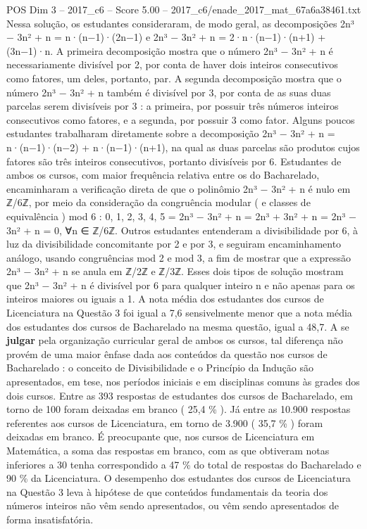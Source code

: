 \begin{textsample}{POS Dim 3 – 2017\_c6 – Score 5.00 – 2017\_c6/enade\_2017\_mat\_67a6a38461.txt}
Nessa solução, os estudantes consideraram, de modo geral, as decomposições 2n³ − 3n² + n = n·(n−1)·(2n−1) e 2n³ − 3n² + n = 2·n·(n−1)·(n+1) + (3n−1)·n.
A primeira decomposição mostra que o número 2n³ − 3n² + n é necessariamente divisível por 2, por conta de haver dois inteiros consecutivos como fatores, um deles, portanto, par.
A segunda decomposição mostra que o número 2n³ − 3n² + n também é divisível por 3, por conta de as suas duas parcelas serem divisíveis por 3 : a primeira, por possuir três números inteiros consecutivos como fatores, e a segunda, por possuir 3 como fator.
Alguns poucos estudantes trabalharam diretamente sobre a decomposição 2n³ − 3n² + n = n·(n−1)·(n−2) + n·(n−1)·(n+1), na qual as duas parcelas são produtos cujos fatores são três inteiros consecutivos, portanto divisíveis por 6.
Estudantes de ambos os cursos, com maior frequência relativa entre os do Bacharelado, encaminharam a verificação direta de que o polinômio 2n³ − 3n² + n é nulo em ℤ/6ℤ, por meio da consideração da congruência modular ( e classes de equivalência ) mod 6 : 0, 1, 2, 3, 4, 5 = 2n³ − 3n² + n = 2n³ + 3n² + n = 2n³ − 3n² + n = 0, ∀n ∈ ℤ/6ℤ.
Outros estudantes entenderam a divisibilidade por 6, à luz da divisibilidade concomitante por 2 e por 3, e seguiram encaminhamento análogo, usando congruências mod 2 e mod 3, a fim de mostrar que a expressão 2n³ − 3n² + n se anula em ℤ/2ℤ e ℤ/3ℤ.
Esses dois tipos de solução mostram que 2n³ − 3n² + n é divisível por 6 para qualquer inteiro n e não apenas para os inteiros maiores ou iguais a 1.
A nota média dos estudantes dos cursos de Licenciatura na Questão 3 foi igual a 7,6 sensivelmente menor que a nota média dos estudantes dos cursos de Bacharelado na mesma questão, igual a 48,7.
A se \textbf{julgar} pela organização curricular geral de ambos os cursos, tal diferença não provém de uma maior ênfase dada aos conteúdos da questão nos cursos de Bacharelado : o conceito de Divisibilidade e o Princípio da Indução são apresentados, em tese, nos períodos iniciais e em disciplinas comuns às grades dos dois cursos.
Entre as 393 respostas de estudantes dos cursos de Bacharelado, em torno de 100 foram deixadas em branco ( 25,4 \% ).
Já entre as 10.900 respostas referentes aos cursos de Licenciatura, em torno de 3.900 ( 35,7 \% ) foram deixadas em branco.
É preocupante que, nos cursos de Licenciatura em Matemática, a soma das respostas em branco, com as que obtiveram notas inferiores a 30 tenha correspondido a 47 \% do total de respostas do Bacharelado e 90 \% da Licenciatura.
O desempenho dos estudantes dos cursos de Licenciatura na Questão 3 leva à hipótese de que conteúdos fundamentais da teoria dos números inteiros não vêm sendo apresentados, ou vêm sendo apresentados de forma insatisfatória.

\end{textsample}
